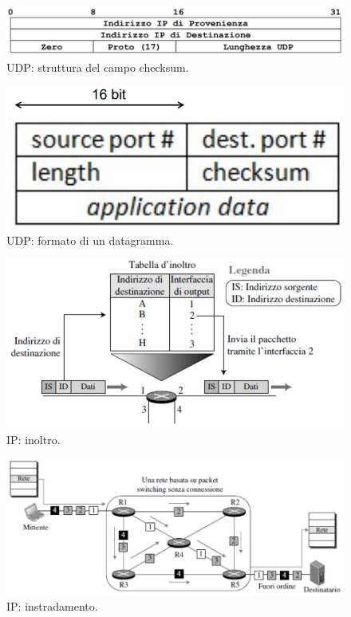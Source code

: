 \documentclass[11pt, italian, openany]{book}
\begin{document}
\begin{sloppypar}
\begin{figure}[!h]
	\centering
	\includegraphics[scale=0.5]{images/udp-checksum.png}
	\caption{UDP: struttura del campo checksum.}
	\label{fig:udp-checksum}
\end{figure}

\begin{figure}[!h]
	\centering
	\includegraphics[scale=0.5]{images/udp-datagramma.png}
	\caption{UDP: formato di un datagramma.}
	\label{fig:udp-datagramma}
\end{figure}

\pagebreak

\begin{figure}[!h]
	\centering
	\includegraphics[scale=0.35]{images/ip-inoltro.png}
	\caption{IP: inoltro.}
	\label{fig:ip-inoltro}
\end{figure}

\begin{figure}[!h]
	\centering
	\includegraphics[scale=0.5]{images/ip-instradamento.png}
	\caption{IP: instradamento.}
	\label{fig:ip-instradamento}
\end{figure}


\end{sloppypar}
\end{document}
